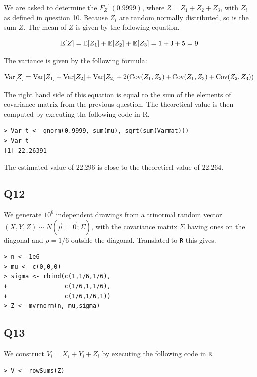 We are asked to determine the $F^{-1}_{Z}(0.9999)$, where $Z = Z_1 + Z_2 + Z_3$, with $Z_i$ as defined in question 10. Because $Z_i$ are random normally distributed, so is the sum $Z$. The mean of $Z$ is given by the following equation.

\begin{displaymath}
\operatorname{\mathbb{E}}[Z] = \operatorname{\mathbb{E}}[Z_1] + \operatorname{\mathbb{E}}[Z_2] + \operatorname{\mathbb{E}}[Z_3] = 1 + 3 + 5 = 9
\end{displaymath}

The variance is given by the following formula:

\begin{displaymath}
\operatorname{\text{Var}}[Z] = \operatorname{\text{Var}}[Z_1] + \operatorname{\text{Var}}[Z_2] + \operatorname{\text{Var}}[Z_2] + 2 (\operatorname{\text{Cov}}(Z_1,Z_2) + \operatorname{\text{Cov}}(Z_1,Z_3) + \operatorname{\text{Cov}}(Z_2,Z_3))
\end{displaymath}

The right hand side of this equation is equal to the sum of the elements of covariance matrix from the previous question. The theoretical value is then computed by executing the following code in R.

\begin{verbatim}
> Var_t <- qnorm(0.9999, sum(mu), sqrt(sum(Varmat)))
> Var_t
[1] 22.26391
\end{verbatim}

The estimated value of $22.296$ is close to the theoretical value of $22.264$.

\subsection*{Q12}

We generate $10^6$ independent drawings from a trinormal random vector $(X,Y,Z) \sim N(\vec{\mu} = \vec{0}; \Sigma)$, with the covariance matrix $\Sigma$ having ones on the diagonal and $\rho = 1/6$ outside the diagonal. Translated to \verb|R| this gives.

\begin{verbatim}
> n <- 1e6
> mu <- c(0,0,0)
> sigma <- rbind(c(1,1/6,1/6),
+                c(1/6,1,1/6),
+                c(1/6,1/6,1))
> Z <- mvrnorm(n, mu,sigma)
\end{verbatim}

\subsection*{Q13}

We construct $V_i = X_i + Y_i + Z_i$ by executing the following code in \verb|R|.

\begin{verbatim}
> V <- rowSums(Z)
\end{verbatim}

